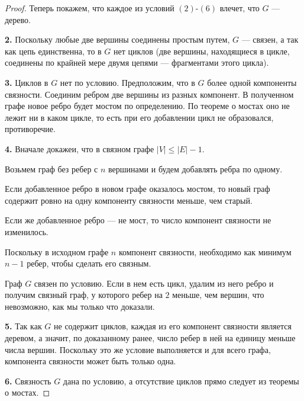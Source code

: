 \begin{proof}
    Теперь покажем, что каждое из условий $(2)$-$(6)$ влечет, что $G$ --- дерево.

    \textbf{2.} Поскольку любые две вершины соединены простым путем, $G$ --- связен, а так как цепь единственна, то в $G$ нет циклов (две вершины, находящиеся в цикле, соединены по крайней мере двумя цепями --- фрагментами этого цикла).

    \textbf{3.} Циклов в $G$ нет по условию. Предположим, что в $G$ более одной компоненты связности. Соединим ребром две вершины из разных компонент. В полученном графе новое ребро будет мостом по определению. По теореме о мостах оно не лежит ни в каком цикле, то есть при его добавлении цикл не образовался, противоречие.

    \textbf{4.} Вначале докажеи, что в связном графе $|V| \leq |E| - 1$. 

    Возьмем граф без ребер с $n$ вершинами и будем добавлять ребра по одному.

    Если добавленное ребро в новом графе оказалось мостом, то новый граф содержит ровно на одну компоненту связности меньше, чем старый.

    Если же добавленное ребро --- не мост, то число компонент связности не изменилось.

    Поскольку в исходном графе $n$ компонент связности, необходимо как минимум $n - 1$ ребер, чтобы сделать его связным.

    Граф $G$ связен по условию. Если в нем есть цикл, удалим из него ребро и получим связный граф, у которого ребер на $2$ меньше, чем вершин, что невозможно, как мы только что доказали.
    
    \textbf{5.} Так как $G$ не содержит циклов, каждая из его компонент связности является деревом, а значит, по доказанному ранее, число ребер в ней на единицу меньше числа вершин. Поскольку это же условие выполняется и для всего графа, компонента связности может быть только одна.

    \textbf{6.} Связность $G$ дана по условию, а отсутствие циклов прямо следует из теоремы о мостах.

\end{proof}